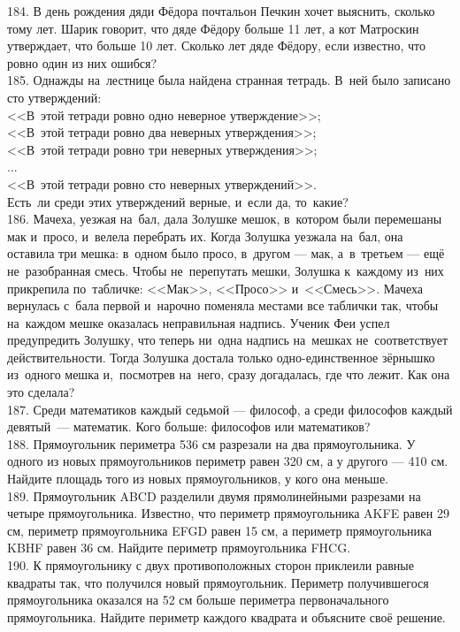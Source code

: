 184. В день рождения дяди Фёдора почтальон Печкин хочет выяснить, сколько тому лет. Шарик говорит, что дяде Фёдору больше 11 лет, а кот Матроскин утверждает, что больше 10 лет. Сколько лет дяде Фёдору, если известно, что ровно один из них ошибся?\\
185. Однажды на лестнице была найдена странная тетрадь. В ней было записано сто утверждений:\\
<<В этой тетради ровно одно неверное утверждение>>;\\
<<В этой тетради ровно два неверных утверждения>>;\\
<<В этой тетради ровно три неверных утверждения>>;\\
...\\
<<В этой тетради ровно сто неверных утверждений>>.\\
Есть ли среди этих утверждений верные, и если да, то какие?\\
186. Мачеха, уезжая на бал, дала Золушке мешок, в котором были перемешаны мак и просо, и велела перебрать их. Когда Золушка уезжала на бал, она оставила три мешка: в одном было просо, в другом --- мак, а в третьем --- ещё не разобранная смесь. Чтобы не перепутать мешки, Золушка к каждому из них прикрепила по табличке: <<Мак>>, <<Просо>> и <<Смесь>>. Мачеха вернулась с бала первой и нарочно поменяла местами все таблички так, чтобы на каждом мешке оказалась неправильная надпись. Ученик Феи успел предупредить Золушку, что теперь ни одна надпись на мешках не соответствует действительности. Тогда Золушка достала только одно-единственное зёрнышко из одного мешка и, посмотрев на него, сразу догадалась, где что лежит. Как она это сделала?\\
187. Среди математиков каждый седьмой --- философ, а среди философов каждый девятый --- математик. Кого больше: философов или математиков?\\
188. Прямоугольник периметра 536 см разрезали на два прямоугольника. У одного из новых прямоугольников периметр равен 320 см, а у другого --- 410 см. Найдите площадь того из новых прямоугольников, у кого она меньше.\\
189. Прямоугольник ABCD разделили двумя прямолинейными разрезами на четыре прямоугольника. Известно, что периметр прямоугольника AKFE равен 29 см, периметр прямоугольника EFGD равен 15 см,  а периметр прямоугольника KBHF равен 36 см. Найдите периметр прямоугольника FHCG.\\
190.  К прямоугольнику с двух противоположных сторон приклеили равные квадраты так, что получился новый прямоугольник. Периметр получившегося прямоугольника оказался на 52 см больше периметра первоначального прямоугольника. Найдите периметр каждого квадрата и объясните своё решение.\\
